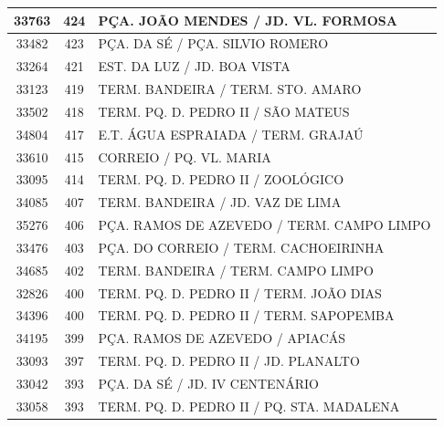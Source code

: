 \documentclass[
	12pt,				%
	oneside,			%
	a4paper,			%
	english,			%
	brazil				%
	]{abntex2ppgsi}
\begin{document}
{{\begin{apendicesenv}
\begin{longtable}{c|c|p{7cm}}
    33763 & 424   & PÇA. JOÃO MENDES / JD. VL. FORMOSA \\
\hline

    33482 & 423   & PÇA. DA SÉ / PÇA. SILVIO ROMERO \\
\hline

    33264 & 421   & EST. DA LUZ / JD. BOA VISTA \\
\hline

    33123 & 419   & TERM. BANDEIRA / TERM. STO. AMARO \\
\hline

    33502 & 418   & TERM. PQ. D. PEDRO II / SÃO MATEUS \\
\hline

    34804 & 417   & E.T. ÁGUA ESPRAIADA / TERM. GRAJAÚ \\
\hline

    33610 & 415   & CORREIO / PQ. VL. MARIA \\
\hline

    33095 & 414   & TERM. PQ. D. PEDRO II / ZOOLÓGICO \\
\hline

    34085 & 407   & TERM. BANDEIRA / JD. VAZ DE LIMA \\
\hline

    35276 & 406   & PÇA. RAMOS DE AZEVEDO / TERM. CAMPO LIMPO \\
\hline

    33476 & 403   & PÇA. DO CORREIO / TERM. CACHOEIRINHA \\
\hline

    34685 & 402   & TERM. BANDEIRA / TERM. CAMPO LIMPO \\
\hline

    32826 & 400   & TERM. PQ. D. PEDRO II / TERM. JOÃO DIAS \\
\hline

    34396 & 400   & TERM. PQ. D. PEDRO II / TERM. SAPOPEMBA \\
\hline

    34195 & 399   & PÇA. RAMOS DE AZEVEDO / APIACÁS \\
\hline

    33093 & 397   & TERM. PQ. D. PEDRO II / JD. PLANALTO \\
\hline

    33042 & 393   & PÇA. DA SÉ / JD. IV CENTENÁRIO \\
\hline

    33058 & 393   & TERM. PQ. D. PEDRO II / PQ. STA. MADALENA \\
\hline


\end{longtable}
\end{apendicesenv}}}
\end{document}
